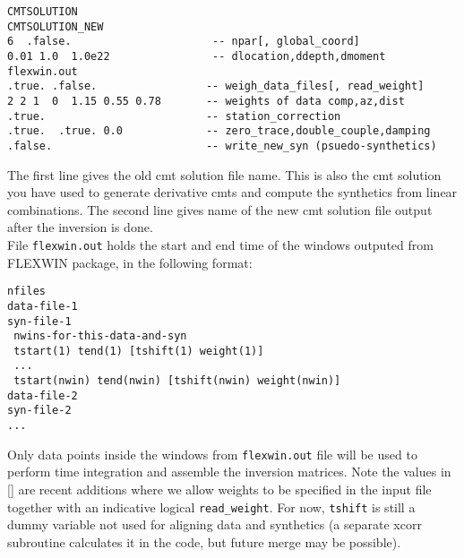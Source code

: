 \documentclass[12pt,titlepage,fleqn]{article}
\begin{document}
\begin{verbatim}
CMTSOLUTION
CMTSOLUTION_NEW
6  .false.                      -- npar[, global_coord]
0.01 1.0  1.0e22                -- dlocation,ddepth,dmoment
flexwin.out
.true. .false.                 -- weigh_data_files[, read_weight]
2 2 1  0  1.15 0.55 0.78       -- weights of data comp,az,dist
.true.                         -- station_correction
.true.  .true. 0.0             -- zero_trace,double_couple,damping
.false.                        -- write_new_syn (psuedo-synthetics)
\end{verbatim}
The first line gives the old cmt solution file name. This is also the cmt solution you have used to generate derivative cmts and compute the synthetics from linear combinations. The second line gives name of the new cmt solution file output after the inversion is done.\\
File \verb=flexwin.out= holds the start and end time of the windows outputed from FLEXWIN package, in the following format:
\begin{verbatim}
nfiles
data-file-1
syn-file-1
 nwins-for-this-data-and-syn
 tstart(1) tend(1) [tshift(1) weight(1)]
 ...
 tstart(nwin) tend(nwin) [tshift(nwin) weight(nwin)]
data-file-2
syn-file-2
...
\end{verbatim}
Only data points inside the windows from \verb+flexwin.out+ file will be used to perform time integration and assemble the inversion matrices. Note the values in [] are recent additions where we allow weights to be specified in the input file together with an indicative logical \verb+read_weight+. For now, \verb+tshift+ is still a dummy variable not used for aligning data and synthetics (a separate xcorr subroutine calculates it in the code, but future merge may be possible).
\end{document}
